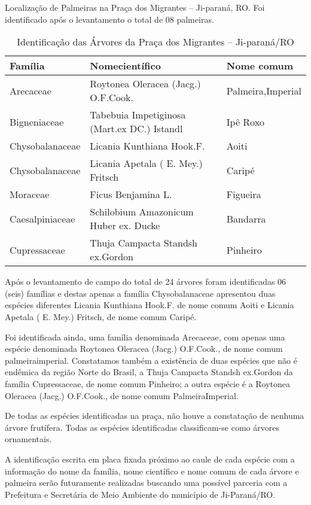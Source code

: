 \documentclass[article,12pt,onesidea,4paper,english,brazil]{abntex2}
\begin{document}
Localização de Palmeiras na Praça dos Migrantes – Ji-paraná, RO. Foi identificado após o levantamento o total de 08 palmeiras. 

\begin{table}[h]
	\centering
	\caption{Identificação das Árvores da Praça dos Migrantes – Ji-paraná/RO}
	\label{my-label}
	\begin{tabular}{lll}
		\hline
		Família         & Nomecientífico                              & Nome comum        \\
		\hline
		Arecaceae       & Roytonea Oleracea (Jacg.) O.F.Cook.         & Palmeira,Imperial \\
		Bigneniaceae    & Tabebuia Impetiginosa (Mart.ex DC.) Istandl & Ipê Roxo          \\
		Chysobalanaceae & Licania Kunthiana Hook.F.                   & Aoiti             \\
		Chysobalanaceae & Licania Apetala ( E. Mey.) Fritsch          & Caripé            \\
		Moraceae        & Ficus Benjamina L.                          & Figueira          \\
		Caesalpiniaceae & Schilobium Amazonicum Huber ex. Ducke       & Bandarra          \\
		Cupressaceae    & Thuja Campacta Standsh ex.Gordon            & Pinheiro 
		\\ \hline        
	\end{tabular}
\end{table}

Após o levantamento de campo do total de 24 árvores foram identificadas 06 (seis) famílias e destas apenas a família Chysobalanaceae apresentou duas espécies diferentes Licania Kunthiana Hook.F. de nome comum Aoiti e Licania Apetala ( E. Mey.) Fritsch, de nome comum Caripé.

Foi identificada ainda, uma família denominada Arecaceae, com apenas uma espécie denominada Roytonea Oleracea (Jacg.) O.F.Cook., de nome comum palmeiraimperial.	Constatamos também a existência de duas espécies que não é endêmica da região Norte do Brasil, a Thuja Campacta Standsh ex.Gordon da família Cupressaceae, de nome comum Pinheiro; a outra espécie é a Roytonea Oleracea (Jacg.) O.F.Cook., de nome comum PalmeiraImperial.

De todas as espécies identificadas na praça, não houve a constatação de nenhuma árvore frutífera. Todas as espécies identificadas classificam-se como árvores ornamentais.

A identificação escrita em placa fixada próximo ao caule de cada espécie com a informação do nome da família, nome científico e nome comum de cada árvore e palmeira serão futuramente realizadas buscando uma possível parceria com a Prefeitura e Secretária de Meio Ambiente do município de Ji-Paraná/RO.
\end{document}
